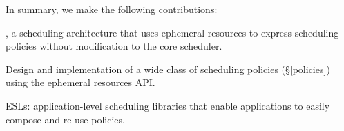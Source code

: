 In summary, we make the following contributions: 

\begin{compactitem}
    \item \name{}, a scheduling architecture that uses ephemeral resources to express scheduling policies without modification to the core scheduler.
    \item Design and implementation of a wide class of scheduling policies (\S\ref{policies}) using the ephemeral resources API.
    \item ESLs: application-level scheduling libraries that enable applications to easily compose and re-use policies.
\end{compactitem}









